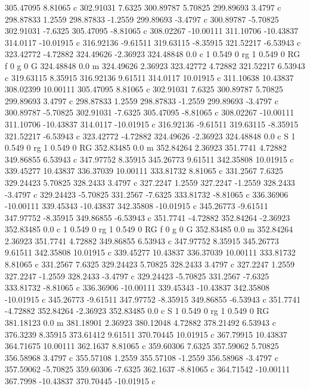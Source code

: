305.47095 8.81065 c 
302.91031 7.6325 
300.89787 5.70825 
299.89693 3.4797 c 
298.87833 1.2559 
298.87833 -1.2559 
299.89693 -3.4797 c 
300.89787 -5.70825 
302.91031 -7.6325 
305.47095 -8.81065 c 
308.02267 -10.00111 
311.10706 -10.43837 
314.0117 -10.01915 c 
316.92136 -9.61511 
319.63115 -8.35915 
321.52217 -6.53943 c 
323.42772 -4.72882 
324.49626 -2.36923 
324.48848 0.0 c 
1 0.549 0 rg 1 0.549 0 RG f 
0 g 0 G 
324.48848 0.0 m 
324.49626 2.36923 
323.42772 4.72882 
321.52217 6.53943 c 
319.63115 8.35915 
316.92136 9.61511 
314.0117 10.01915 c 
311.10638 10.43837 
308.02399 10.00111 
305.47095 8.81065 c 
302.91031 7.6325 
300.89787 5.70825 
299.89693 3.4797 c 
298.87833 1.2559 
298.87833 -1.2559 
299.89693 -3.4797 c 
300.89787 -5.70825 
302.91031 -7.6325 
305.47095 -8.81065 c 
308.02267 -10.00111 
311.10706 -10.43837 
314.0117 -10.01915 c 
316.92136 -9.61511 
319.63115 -8.35915 
321.52217 -6.53943 c 
323.42772 -4.72882 
324.49626 -2.36923 
324.48848 0.0 c 
S 
1 0.549 0 rg 1 0.549 0 RG 
352.83485 0.0 m 
352.84264 2.36923 
351.7741 4.72882 
349.86855 6.53943 c 
347.97752 8.35915 
345.26773 9.61511 
342.35808 10.01915 c 
339.45277 10.43837 
336.37039 10.00111 
333.81732 8.81065 c 
331.2567 7.6325 
329.24423 5.70825 
328.2433 3.4797 c 
327.2247 1.2559 
327.2247 -1.2559 
328.2433 -3.4797 c 
329.24423 -5.70825 
331.2567 -7.6325 
333.81732 -8.81065 c 
336.36906 -10.00111 
339.45343 -10.43837 
342.35808 -10.01915 c 
345.26773 -9.61511 
347.97752 -8.35915 
349.86855 -6.53943 c 
351.7741 -4.72882 
352.84264 -2.36923 
352.83485 0.0 c 
1 0.549 0 rg 1 0.549 0 RG f 
0 g 0 G 
352.83485 0.0 m 
352.84264 2.36923 
351.7741 4.72882 
349.86855 6.53943 c 
347.97752 8.35915 
345.26773 9.61511 
342.35808 10.01915 c 
339.45277 10.43837 
336.37039 10.00111 
333.81732 8.81065 c 
331.2567 7.6325 
329.24423 5.70825 
328.2433 3.4797 c 
327.2247 1.2559 
327.2247 -1.2559 
328.2433 -3.4797 c 
329.24423 -5.70825 
331.2567 -7.6325 
333.81732 -8.81065 c 
336.36906 -10.00111 
339.45343 -10.43837 
342.35808 -10.01915 c 
345.26773 -9.61511 
347.97752 -8.35915 
349.86855 -6.53943 c 
351.7741 -4.72882 
352.84264 -2.36923 
352.83485 0.0 c 
S 
1 0.549 0 rg 1 0.549 0 RG 
381.18123 0.0 m 
381.18901 2.36923 
380.12048 4.72882 
378.21492 6.53943 c 
376.3239 8.35915 
373.61412 9.61511 
370.70445 10.01915 c 
367.79915 10.43837 
364.71675 10.00111 
362.1637 8.81065 c 
359.60306 7.6325 
357.59062 5.70825 
356.58968 3.4797 c 
355.57108 1.2559 
355.57108 -1.2559 
356.58968 -3.4797 c 
357.59062 -5.70825 
359.60306 -7.6325 
362.1637 -8.81065 c 
364.71542 -10.00111 
367.7998 -10.43837 
370.70445 -10.01915 c 
